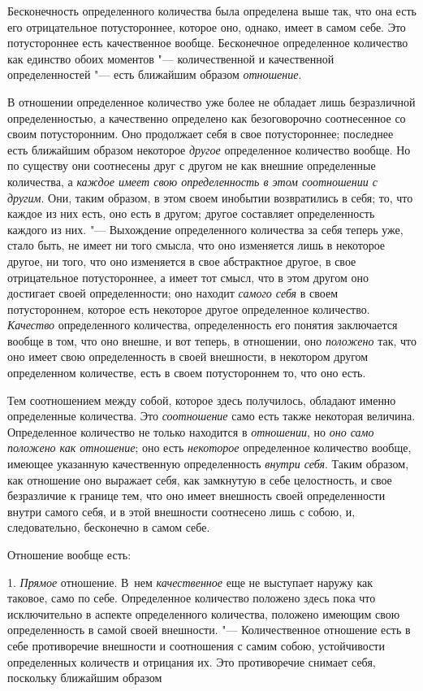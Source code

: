 Бесконечность определенного количества была определена выше так, что она
есть его отрицательное потустороннее, которое оно, однако, имеет в самом
себе. Это потустороннее есть качественное вообще. Бесконечное определенное
количество как единство обоих моментов "--- количественной и качественной
определенностей "--- есть ближайшим образом {\em отношение}.

В отношении определенное количество уже более не обладает лишь безразличной
определенностью, а качественно определено как безоговорочно соотнесенное со
своим потусторонним. Оно продолжает себя в свое потустороннее; последнее
есть ближайшим образом некоторое {\em другое}
определенное количество вообще. Но по существу они соотнесены друг с другом
не как внешние определенные количества, а {\em каждое
имеет свою определенность в этом соотношении с другим}. Они, таким образом,
в этом своем инобытии возвратились в себя; то, что каждое из них есть, оно
есть в другом; другое составляет определенность каждого из них. "---
Выхождение определенного количества за себя теперь уже, стало быть, не
имеет ни того смысла, что оно изменяется лишь в некоторое другое, ни того,
что оно изменяется в свое абстрактное другое, в свое отрицательное
потустороннее, а имеет тот смысл, что в этом другом оно достигает своей
определенности; оно находит {\em самого себя} в своем
потустороннем, которое есть некоторое другое определенное количество.
{\em Качество} определенного количества, определенность
его понятия заключается вообще в том, что оно внешне, и вот теперь, в
отношении, оно {\em положено} так, что оно имеет свою
определенность в своей внешности, в некотором другом определенном
количестве, есть в своем потустороннем то, что оно есть.

Тем соотношением между собой, которое здесь получилось, обладают именно
определенные количества. Это {\em соотношение} само
есть также некоторая величина. Определенное количество не только находится
в {\em отношении}, но {\em оно само
положено как отношение}; оно есть {\em некоторое}
определенное количество вообще, имеющее указанную качественную
определенность {\em внутри себя}. Таким образом, как
отношение оно выражает себя, как замкнутую в себе целостность, и свое
безразличие к границе тем, что оно имеет внешность своей определенности
внутри самого себя, и в этой внешности соотнесено лишь с собою, и,
следовательно, бесконечно в самом себе.

Отношение вообще есть:

1. {\em Прямое} отношение. В~нем
{\em качественное} еще не выступает наружу как таковое,
само по себе. Определенное количество положено здесь пока что исключительно
в аспекте определенного количества, положено имеющим свою определенность в
самой своей внешности. "--- Количественное отношение есть в себе противоречие
внешности и соотношения с самим собою, устойчивости определенных количеств
и отрицания их. Это противоречие снимает себя, поскольку ближайшим образом

